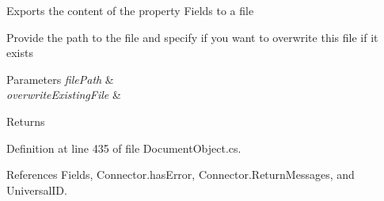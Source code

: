 Exports the content of the property \textquotesingle{}Fields\textquotesingle{} to a file 

Provide the path to the file and specify if you want to overwrite this file if it exists


\begin{DoxyParams}{Parameters}
{\em file\+Path} & \\
\hline
{\em overwrite\+Existing\+File} & \\
\hline
\end{DoxyParams}
\begin{DoxyReturn}{Returns}

\end{DoxyReturn}


Definition at line 435 of file Document\+Object.\+cs.



References Fields, Connector.\+has\+Error, Connector.\+Return\+Messages, and Universal\+ID.


